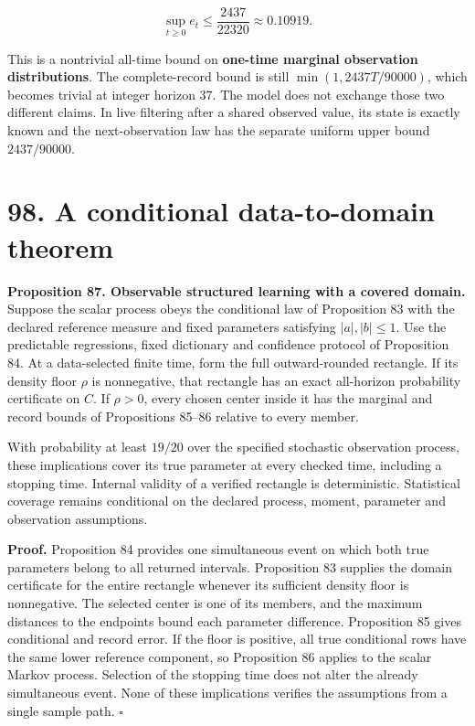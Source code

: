 \documentclass[11pt,letterpaper]{article}
\begin{document}
\[
\boxed{
\sup_{t\geq0}e_t\leq\frac{2437}{22320}
\approx0.10919.
}
\]

This is a nontrivial all-time bound on \textbf{one-time marginal
observation distributions}. The complete-record bound is still
\(\min(1,2437T/90000)\), which becomes trivial at integer horizon 37.
The model does not exchange those two different claims. In live
filtering after a shared observed value, its state is exactly known and
the next-observation law has the separate uniform upper bound
\(2437/90000\).

\section{98. A conditional data-to-domain
theorem}\label{a-conditional-data-to-domain-theorem}

\textbf{Proposition 87. Observable structured learning with a covered
domain.} Suppose the scalar process obeys the conditional law of
Proposition 83 with the declared reference measure and fixed parameters
satisfying \(|a|,|b|\leq1\). Use the predictable regressions, fixed
dictionary and confidence protocol of Proposition 84. At a data-selected
finite time, form the full outward-rounded rectangle. If its density
floor \(\rho\) is nonnegative, that rectangle has an exact all-horizon
probability certificate on \(C\). If \(\rho>0\), every chosen center
inside it has the marginal and record bounds of Propositions 85--86
relative to every member.

With probability at least \(19/20\) over the specified stochastic
observation process, these implications cover its true parameter at
every checked time, including a stopping time. Internal validity of a
verified rectangle is deterministic. Statistical coverage remains
conditional on the declared process, moment, parameter and observation
assumptions.

\textbf{Proof.} Proposition 84 provides one simultaneous event on which
both true parameters belong to all returned intervals. Proposition 83
supplies the domain certificate for the entire rectangle whenever its
sufficient density floor is nonnegative. The selected center is one of
its members, and the maximum distances to the endpoints bound each
parameter difference. Proposition 85 gives conditional and record error.
If the floor is positive, all true conditional rows have the same lower
reference component, so Proposition 86 applies to the scalar Markov
process. Selection of the stopping time does not alter the already
simultaneous event. None of these implications verifies the assumptions
from a single sample path. \(\square\)
\end{document}
